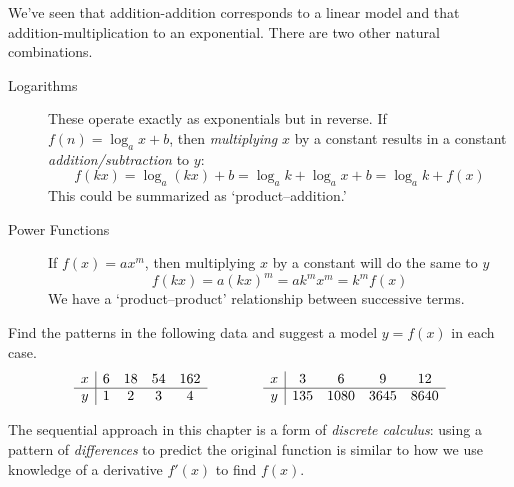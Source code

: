 We've seen that addition-addition corresponds to a linear model and that addition-multiplication to an exponential. There are two other natural combinations.

\begin{description}
	\item[Logarithms] These operate exactly as exponentials but in reverse. If $f(n)=\log_a x+b$, then \emph{multiplying} $x$ by a constant results in a constant \emph{addition/subtraction} to $y$:
		\[f(kx)=\log_a(kx)+b=\log_ak+\log_ax+b=\log_ak+f(x)\]
		This could be summarized as `product--addition.'
	\item[Power Functions] If $f(x)=ax^m$, then multiplying $x$ by a constant will do the same to $y$
		\[f(kx)=a(kx)^m=ak^mx^m=k^mf(x)\]
		We have a `product--product' relationship between successive terms.
\end{description}


\begin{examples}{}{}
Find the patterns in the following data and suggest a model $y=f(x)$ in each case.
\[\begin{array}[t]{c|cccc}
		x&6&18&54&162\\\hline
		y&1&2&3&4
		\end{array}
		\qquad\qquad\begin{array}[t]{c|cccc}
		x&3&6&9&12\\\hline
		y&135&1080&3645&8640
		\end{array}\]
\end{examples}

The sequential approach in this chapter is a form of \emph{discrete calculus}: using a pattern of \emph{differences} to predict the original function is similar to how we use knowledge of a derivative $f'(x)$ to find $f(x)$.

\goodbreak



